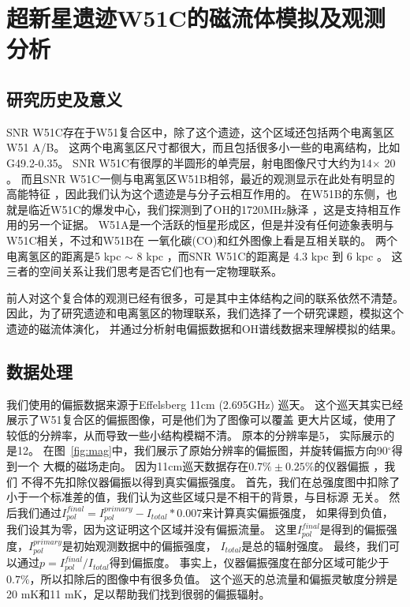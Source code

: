 \chapter{超新星遗迹W51C的磁流体模拟及观测分析}
\label{W51C}



\section{研究历史及意义}
\label{W51Cintro}
SNR W51C存在于W51复合区中，除了这个遗迹，这个区域还包括两个电离氢区W51 A/B。
这两个电离氢区尺寸都很大，而且包括很多小一些的电离结构，比如G49.2-0.35。
SNR W51C有很厚的半圆形的单壳层，射电图像尺寸大约为14\am $\times$ 20\am
\citep{Copetti1991,Subrahmanyan1995}。
而且SNR W51C一侧与电离氢区W51B相邻，最近的观测显示在此处有明显的高能特征
\citep{Abdo2009,Aleksic2012}，因此我们认为这个遗迹是与分子云相互作用的。
在W51B的东侧，也就是临近W51C的爆发中心，我们探测到了OH的1720MHz脉泽
\citep{Hewitt2008,Brogan2013}，这是支持相互作用的另一个证据。
W51A是一个活跃的恒星形成区，但是并没有任何迹象表明与W51C相关，不过和W51B在
一氧化碳(CO)和红外图像上看是互相关联的\citep{Kang2010,Parsons2012,Ginsburg2015}。
两个电离氢区的距离是5 kpc $\sim$ 8 kpc
\citep{Genzel1981,Schneps1981,Xu2009,Sato2010,Tian2013}，而SNR W51C的距离是
4.3 kpc \citep{Tian2013} 到 6 kpc \citep{Koo1995}。
这三者的空间关系让我们思考是否它们也有一定物理联系。

前人对这个复合体的观测已经有很多，可是其中主体结构之间的联系依然不清楚。
因此，为了研究遗迹和电离氢区的物理联系，我们选择了一个研究课题，模拟这个遗迹的磁流体演化，
并通过分析射电偏振数据和OH谱线数据来理解模拟的结果。

\section{数据处理}
\label{W51Cdata}

我们使用的偏振数据来源于Effelsberg 11cm (2.695GHz) 巡天\citep{1999A&A...350..447D}。
这个巡天其实已经展示了W51复合区的偏振图像，可是他们为了图像可以覆盖
更大片区域，使用了较低的分辨率，从而导致一些小结构模糊不清。
原本的分辨率是5\am， 实际展示的是12\am。
在图~\ref{fig:mag}中，我们展示了原始分辨率的偏振图，并旋转偏振方向90$^{\circ}$得到一个
大概的磁场走向。
因为11cm巡天数据存在$0.7\% \pm 0.25\%$的仪器偏振 \citep{1987A&AS...69..451J}，我们
不得不先扣除仪器偏振以得到真实偏振强度。
首先，我们在总强度图中扣除了小于一个标准差的值，我们认为这些区域只是不相干的背景，与目标源
无关。
然后我们通过$I^{final}_{pol}=I^{primary}_{pol}-I_{total}*0.007$来计算真实偏振强度，
如果得到负值，我们设其为零，因为这证明这个区域并没有偏振流量。
这里$I^{final}_{pol}$是得到的偏振强度，$I^{primary}_{pol}$是初始观测数据中的偏振强度，
$I_{total}$是总的辐射强度。
最终，我们可以通过$p=I^{final}_{pol}/I_{total}$得到偏振度。
事实上，仪器偏振强度在部分区域可能少于$0.7\%$，所以扣除后的图像中有很多负值。
这个巡天的总流量和偏振灵敏度分辨是20 mK和11 mK，足以帮助我们找到很弱的偏振辐射。

